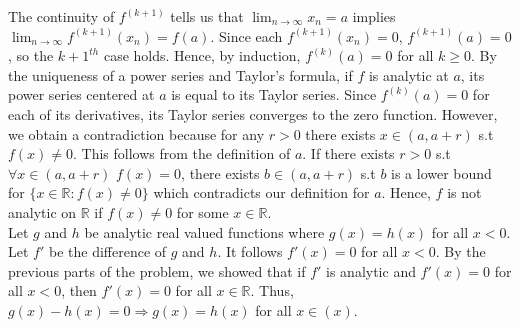 \documentclass[10pt]{article}
\begin{document}
\begin{enumerate}[label=Problem \arabic*.]
    The continuity of $f^{(k+1)}$ tells us that $\displaystyle\lim_{n\rightarrow\infty}x_n=a$ implies $\displaystyle\lim_{n\rightarrow\infty}f^{(k+1)}(x_n)=f(a)$. 
    Since each $f^{(k+1)}(x_n)=0$, $f^{(k+1)}(a)=0$, so the $k+1^{th}$ case holds.
    Hence, by induction, $f^{(k)}(a)=0$ for all $k\ge0$. 
    By the uniqueness of a power series and Taylor's formula, if $f$ is analytic at $a$, its power series centered at $a$ is equal to its Taylor series.
    Since $f^{(k)}(a)=0$ for each of its derivatives, its Taylor series converges to the zero function.
    However, we obtain a contradiction because for any $r>0$ there exists $x\in(a,a+r)$ s.t $f(x)\neq0$. 
    This follows from the definition of $a$. If there exists $r>0$ s.t $\forall x\in(a,a+r)$ $f(x)=0$, there exists $b\in(a,a+r)$ s.t $b$ is a lower bound for $\{x\in\mathbb{R}:f(x)\neq0\}$ which contradicts our definition for $a$.
    Hence, $f$ is not analytic on $\mathbb{R}$ if $f(x)\neq0$ for some $x\in\mathbb{R}$.\\

    Let $g$ and $h$ be analytic real valued functions where $g(x)=h(x)$ for all $x<0$.
    Let $f'$ be the difference of $g$ and $h$. It follows $f'(x)=0$ for all $x<0$.
    By the previous parts of the problem, we showed that if $f'$ is analytic and $f'(x)=0$ for all $x<0$, then $f'(x)=0$ for all $x\in\mathbb{R}$.
    Thus, $g(x)-h(x)=0\Rightarrow g(x)=h(x)$ for all $x\in(x)$.

\end{enumerate}
\end{document}
